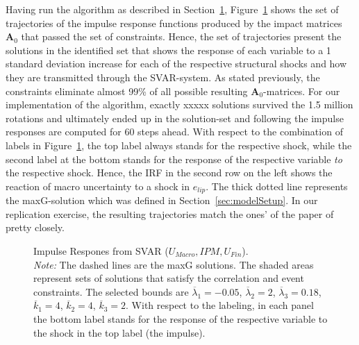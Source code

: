 \documentclass[a4paper,11pt,listof=nochaptergap,oneside,pointednumbers,bibtotoc,bigheadings,liststotoc,hidelinks]{scrbook}
\theoremstyle{mysatz}
\theoremstyle{mydefinition}
\theoremstyle{mytheorem}
\theoremstyle{mybemerkung}
\newcommand{\vect}[1]{\boldsymbol{\mathbf{#1}}}
\begin{document}
Having run the algorithm as described in Section~\ref{fig:impulse.responses_all.SVAR}, Figure~\ref{fig:impulse.responses_all.SVAR} shows the set of trajectories of the impulse response functions produced by the impact matrices $\vect{A}_0$ that passed the set of constraints. Hence, the set of trajectories present the solutions in the identified set that shows the response of each variable to a 1 standard deviation increase for each of the respective structural shocks and how they are transmitted through the SVAR-system. As stated previously, the constraints eliminate almost 99\% of all possible resulting $\vect{A}_0$-matrices. For our implementation of the algorithm, exactly xxxxx solutions survived the 1.5 million rotations and ultimately ended up in the solution-set and following \citet{ludvigsonetal:19} the impulse responses are computed for 60 steps ahead. With respect to the combination of labels in Figure~\ref{fig:impulse.responses_all.SVAR}, the top label always stands for the respective shock, while the second label at the bottom stands for the response of the respective variable \textit{to} the respective shock. Hence, the IRF in the second row on the left shows the reaction of macro uncertainty to a shock in $e_{lip}$. The thick dotted line represents the maxG-solution which was defined in Section~\ref{sec:modelSetup}. In our replication exercise, the resulting trajectories match the ones' of the paper of \citet{ludvigsonetal:18} pretty closely. 


\begin{figure}[!h]
   \centering
   \setlength\fboxsep{0pt}
   \setlength\fboxrule{0pt}
      \caption[Impulse Respones from SVAR ($U_{Macro}, IPM, U_{Fin}$).]{Impulse Respones from SVAR ($U_{Macro}, IPM, U_{Fin}$).\\
      \textit{Note:}  The dashed lines are the maxG solutions. The shaded areas represent sets of solutions that satisfy the correlation and event constraints. The selected bounds are $\overline{\lambda}_1 = -0.05$, $\overline{\lambda}_2 = 2$, $\overline{\lambda}_3 = 0.18$, $\overline{k}_1 = 4$, $\overline{k}_2 = 4$, $\overline{k}_3 = 2$. With respect to the labeling, in each panel the bottom label stands for the response of the respective variable to the shock in the top label (the impulse).}   \label{fig:impulse.responses_all.SVAR}
\end{figure}
\end{document}
